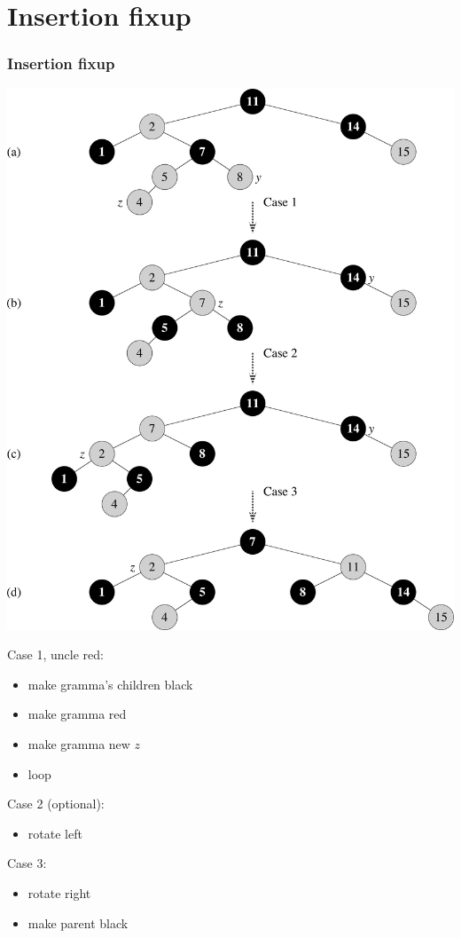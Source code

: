 \documentclass{beamer}
\newcommand{\bi}{\begin{itemize}}
\newcommand{\ii}{\item}
\newcommand{\ei}{\end{itemize}}
\newcommand{\sect}[1]{
\section{#1}
\begin{frame}[fragile]\frametitle{#1}
}
\begin{document}
\sect{Insertion fixup}
\begin{multicols}{2}
\includegraphics[height=0.8\textheight]{Fig-13-4.pdf}
\columnbreak

  \begin{description}
  \ii Case 1, uncle red:
  \bi
  \ii make gramma's children black
  \ii make gramma red
  \ii make gramma new $z$
  \ii loop
  \ei
\ii Case 2 (optional):
\bi
\ii rotate left
\ei
\ii Case 3:
\bi
\ii rotate right
\ii make parent black
\ei
  \end{description}
\end{multicols}
\end{frame}
\end{document}
